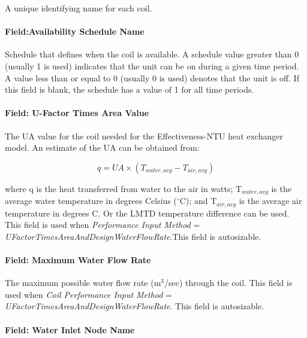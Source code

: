 A unique identifying name for each coil.

\paragraph{Field:Availability Schedule Name}\label{fieldavailability-schedule-name-1-000}

Schedule that defines when the coil is available. A schedule value greater than 0 (usually 1 is used) indicates that the unit can be on during a given time period. A value less than or equal to 0 (usually 0 is used) denotes that the unit is off. If this field is blank, the schedule has a value of 1 for all time periods.

\paragraph{Field: U-Factor Times Area Value}\label{field-u-factor-times-area-value}

The UA value for the coil needed for the Effectiveness-NTU heat exchanger model. An estimate of the UA can be obtained from:

\begin{equation}
q = UA \times ({T_{water,avg}} - {T_{air,avg}})
\end{equation}

where q is the heat transferred from water to the air in watts; T\(_{water, avg}\) is the average water temperature in degrees Celsius ($^\circ$C); and T\(_{air, avg}\) is the average air temperature in degrees C. Or the LMTD temperature difference can be used. This field is used when \emph{Performance Input Method} = \emph{UFactorTimesAreaAndDesignWaterFlowRate}.This field is autosizable.

\paragraph{Field: Maximum Water Flow Rate}\label{field-maximum-water-flow-rate-000}

The maximum possible water flow rate (m\(^{3}\)/sec) through the coil. This field is used when \emph{Coil Performance Input Method} = \emph{UFactorTimesAreaAndDesignWaterFlowRate}. This field is autosizable.

\paragraph{Field: Water Inlet Node Name}\label{field-water-inlet-node-name-1-000}


